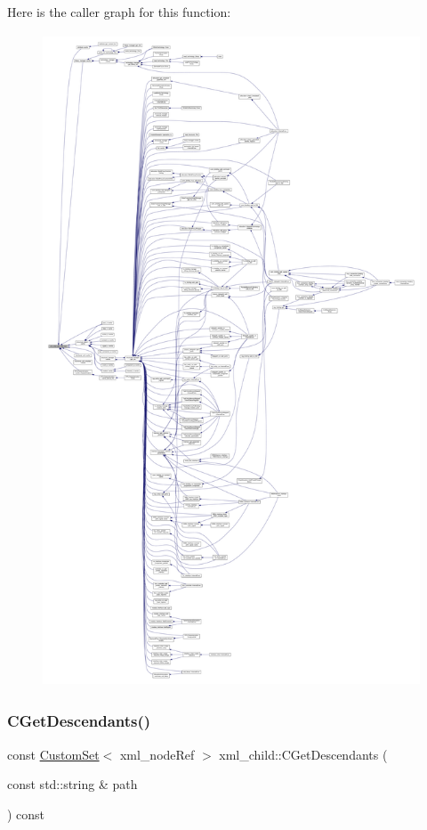 Here is the caller graph for this function\+:
\nopagebreak
\begin{figure}[H]
\begin{center}
\leavevmode
\includegraphics[height=550pt]{d7/df9/classxml__child_aed891875a02dccfdcf459956e728f872_icgraph}
\end{center}
\end{figure}
\mbox{\label{classxml__child_ae73bf4c48fc19ebe96e54bfdad7cfe5a}} 
\subsubsection{\texorpdfstring{C\+Get\+Descendants()}{CGetDescendants()}}
{\footnotesize\ttfamily const \hyperlink{custom__set_8hpp_a615bc2f42fc38a4bb1790d12c759e86f}{Custom\+Set}$<$ xml\+\_\+node\+Ref $>$ xml\+\_\+child\+::\+C\+Get\+Descendants (\begin{DoxyParamCaption}\item[{const std\+::string \&}]{path }\end{DoxyParamCaption}) const}



